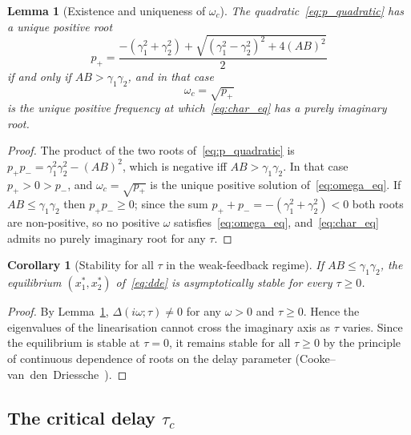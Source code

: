 \documentclass[sn-mathphys,Numbered]{sn-jnl}
\theoremstyle{thmstyleone}
\newtheorem{corollary}{Corollary}
\newtheorem{lemma}[theorem]{Lemma}
\theoremstyle{thmstyletwo}
\theoremstyle{thmstylethree}
\begin{document}
\begin{lemma}[Existence and uniqueness of $\omega_c$]
\label{lem:omega}
The quadratic~\eqref{eq:p_quadratic} has a unique positive root
\begin{equation}
p_+ = \frac{-(\gamma_1^2+\gamma_2^2)+\sqrt{(\gamma_1^2-\gamma_2^2)^2+4(AB)^2}}{2}
\label{eq:p_plus}
\end{equation}
if and only if $AB>\gamma_1\gamma_2$, and in that case
\begin{equation}
\omega_c = \sqrt{p_+}
\label{eq:omega_c}
\end{equation}
is the unique positive frequency at which~\eqref{eq:char_eq} has a purely
imaginary root.
\end{lemma}
\begin{proof}
The product of the two roots of~\eqref{eq:p_quadratic} is
$p_+ p_- = \gamma_1^2\gamma_2^2 - (AB)^2$, which is negative iff
$AB>\gamma_1\gamma_2$. In that case $p_+>0>p_-$, and $\omega_c=\sqrt{p_+}$
is the unique positive solution of~\eqref{eq:omega_eq}. If
$AB\leq\gamma_1\gamma_2$ then $p_+ p_-\geq 0$; since the sum
$p_++p_-=-(\gamma_1^2+\gamma_2^2)<0$ both roots are non-positive, so
no positive $\omega$ satisfies~\eqref{eq:omega_eq}, and~\eqref{eq:char_eq}
admits no purely imaginary root for any $\tau$.
\end{proof}

\begin{corollary}[Stability for all $\tau$ in the weak-feedback regime]
If $AB\leq\gamma_1\gamma_2$, the equilibrium $(x_1^*,x_2^*)$
of~\eqref{eq:dde} is asymptotically stable for every $\tau\geq 0$.
\end{corollary}
\begin{proof}
By Lemma~\ref{lem:omega}, $\Delta(i\omega;\tau)\neq 0$ for any $\omega>0$
and $\tau\geq 0$. Hence the eigenvalues of the linearisation cannot cross
the imaginary axis as $\tau$ varies. Since the equilibrium is stable at
$\tau=0$, it remains stable for all $\tau\geq 0$ by the principle of
continuous dependence of roots on the delay parameter
(Cooke--van~den~Driessche~\cite{cooke1986zeroes}).
\end{proof}

\subsection{The critical delay $\tau_c$}
\end{document}
